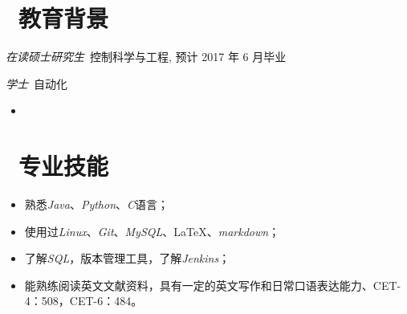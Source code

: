 \documentclass{resume}
\begin{document}



\section{\faGraduationCap\  教育背景}
\textit{在读硕士研究生}\ 控制科学与工程, 预计 2017 年 6 月毕业

\textit{学士}\ 自动化
\begin{itemize}
\item {}

\end{itemize}

\section{\faCogs\ 专业技能}
\begin{itemize}[parsep=1ex]
  \item 熟悉\emph{Java}、\emph{Python}、\emph{C}语言；
  \item 使用过\emph{Linux}、\emph{Git}、\emph{MySQL}、\LaTeX 、\emph{markdown}；
  \item 了解\emph{SQL}，版本管理工具，了解\emph{Jenkins}；
  \item 能熟练阅读英文文献资料，具有一定的英文写作和日常口语表达能力、CET-4：508，CET-6：484。

\end{itemize}
\end{document}
